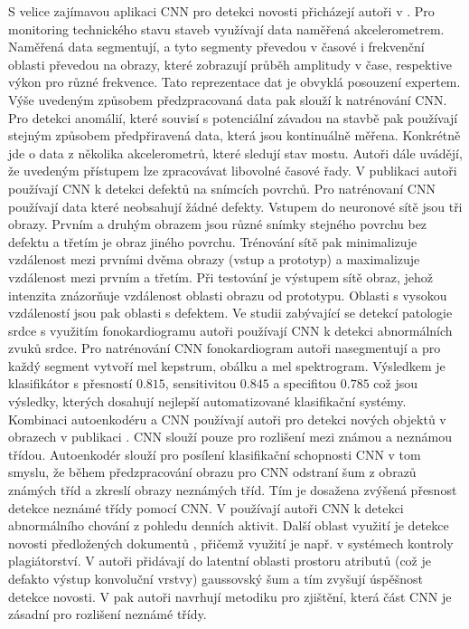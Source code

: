 S velice zajímavou aplikaci CNN pro detekci novosti přicházejí autoři v \cite{cnn2}. Pro monitoring technického stavu staveb využívají data naměřená akcelerometrem. Naměřená data segmentují, a tyto segmenty převedou v časové i frekvenční oblasti převedou na obrazy, které zobrazují průběh amplitudy v čase, respektive výkon pro různé frekvence. Tato reprezentace dat je obvyklá posouzení expertem. Výše uvedeným způsobem předzpracovaná data pak slouží k natrénování CNN. Pro detekci anomálií, které souvisí s potenciální závadou na stavbě pak používají stejným způsobem předpřiravená data, která jsou kontinuálně měřena. Konkrétně jde o data z několika akcelerometrů, které sledují stav mostu. Autoři dále uvádějí, že uvedeným přístupem lze zpracovávat libovolné časové řady. V publikaci \cite{cnn3} autoři používají CNN k detekci defektů na snímcích povrchů. Pro natrénovaní CNN používají data které neobsahují žádné defekty. Vstupem do neuronové sítě jsou tři obrazy. Prvním a druhým obrazem jsou různé snímky stejného povrchu bez defektu a třetím je obraz jiného povrchu. Trénování sítě pak minimalizuje vzdálenost mezi prvními dvěma obrazy (vstup a prototyp) a maximalizuje vzdálenost mezi prvním a třetím. Při testování je výstupem sítě obraz, jehož intenzita znázorňuje vzdálenost oblasti obrazu od prototypu. Oblasti s vysokou vzdáleností jsou pak oblasti s defektem.  Ve studii zabývající se detekcí patologie srdce s využitím fonokardiogramu \cite{cnn4} autoři používají CNN k detekci abnormálních zvuků srdce. Pro natrénování CNN fonokardiogram autoři nasegmentují a pro každý segment vytvoří mel kepstrum, obálku a mel spektrogram.  Výsledkem je klasifikátor s přesností $0.815$, sensitivitou $0.845$ a specifitou $0.785$ což jsou výsledky, kterých dosahují nejlepší automatizované klasifikační systémy. Kombinaci autoenkodéru a CNN používají autoři pro detekci nových objektů v obrazech v publikaci \cite{cnn5}. CNN slouží pouze pro rozlišení mezi známou a neznámou třídou. Autoenkodér slouží pro posílení klasifikační schopnosti CNN v tom smyslu, že během předzpracování obrazu pro CNN odstraní šum z obrazů známých tříd a zkreslí obrazy neznámých tříd. Tím je dosažena zvýšená přesnost detekce neznámé třídy pomocí CNN. V \cite{cnn6} používají autoři CNN k detekci abnormálního chování  z pohledu denních aktivit. Další oblast využití je detekce novosti předložených dokumentů \cite{cnn7}, přičemž využití je např. v systémech kontroly plagiátorství. V \cite{cnn8} autoři přidávají do latentní oblasti prostoru atributů (což je defakto výstup konvoluční vrstvy) gaussovský šum a tím zvyšují úspěšnost detekce novosti. V \cite{cnn9} pak autoři navrhují metodiku pro zjištění, která část CNN je zásadní pro rozlišení neznámé třídy.
